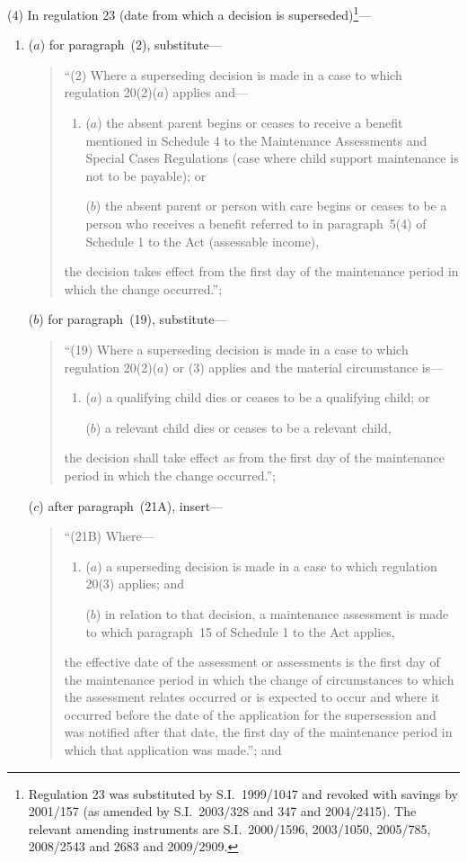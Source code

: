 \documentclass[12pt,a4paper]{article}
\begin{document}
(4) In regulation 23 (date from which a decision is superseded)\footnote{Regulation 23 was substituted by S.I.~1999/1047 and revoked with savings by 2001/157 (as amended by S.I.~2003/328 and 347 and 2004/2415). The relevant amending instruments are S.I.~2000/1596, 2003/1050, 2005/785, 2008/2543 and 2683 and 2009/2909.}—
\begin{enumerate}\item[]
($a$) for paragraph~(2), substitute—
\begin{quotation}
“(2) Where a superseding decision is made in a case to which regulation 20(2)($a$)  applies and—
\begin{enumerate}\item[]
($a$) the absent parent begins or ceases to receive a benefit mentioned in Schedule 4 to the Maintenance Assessments and Special Cases Regulations (case where child support maintenance is not to be payable); or

($b$) the absent parent or person with care begins or ceases to be a person who receives a benefit referred to in paragraph~5(4) of Schedule 1 to the Act (assessable income),
\end{enumerate}
the decision takes effect from the first day of the maintenance period in which the change occurred.”;
\end{quotation}

($b$) for paragraph~(19), substitute—
\begin{quotation}
“(19) Where a superseding decision is made in a case to which regulation 20(2)($a$)  or (3) applies and the material circumstance is—
\begin{enumerate}\item[]
($a$) a qualifying child dies or ceases to be a qualifying child; or

($b$) a relevant child dies or ceases to be a relevant child,
\end{enumerate}
the decision shall take effect as from the first day of the maintenance period in which the change occurred.”;
\end{quotation}

($c$) after paragraph~(21A), insert—
\begin{quotation}
“(21B) Where—
\begin{enumerate}\item[]
($a$) a superseding decision is made in a case to which regulation 20(3) applies; and

($b$) in relation to that decision, a maintenance assessment is made to which paragraph~15 of Schedule 1 to the Act applies,
\end{enumerate}
the effective date of the assessment or assessments is the first day of the maintenance period in which the change of circumstances to which the assessment relates occurred or is expected to occur and where it occurred before the date of the application for the supersession and was notified after that date, the first day of the maintenance period in which that application was made.”; and
\end{quotation}


\end{enumerate}
\end{document}
